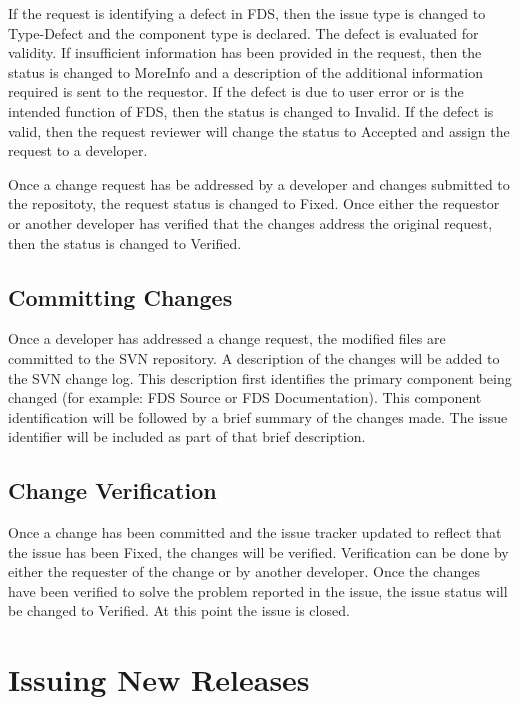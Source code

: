 \documentclass[11pt]{book}
\begin{document}
If the request is identifying a defect in FDS, then the issue type is changed to {\ct Type-Defect} and the
component type is declared.  The defect is evaluated for validity.  If insufficient information has
been provided in the request, then the status is changed to {\ct MoreInfo} and a description of the additional
information required is sent to the requestor.  If the defect is due to user error or is the intended function of FDS,
then the status is changed to {\ct Invalid}.  If the defect is valid, then the request reviewer will change the
status to {\ct Accepted} and assign the request to a developer.

Once a change request has be addressed by a developer and changes submitted to the repositoty, the request status
is changed to {\ct Fixed}.  Once either the requestor or another developer has verified that the changes address
the original request, then the status is changed to {\ct Verified}.


\subsection{Committing Changes}

Once a developer has addressed a change request, the modified files are committed to the SVN repository.  A description
of the changes will be added to the SVN change log.  This description first identifies the primary component being
changed (for example: FDS Source or FDS Documentation).  This component identification will be followed by a brief
summary of the changes made.  The issue identifier will be included as part of that brief description.

\subsection{Change Verification}

Once a change has been committed and the issue tracker updated to reflect that the issue has been {\ct Fixed},
the changes will be verified.  Verification can be done by either the requester of the change or by another
developer.  Once the changes have been verified to solve the problem reported in the issue, the issue status will
be changed to {\ct Verified}.  At this point the issue is closed.



\section{Issuing New Releases}
\end{document}
